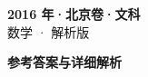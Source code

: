 \documentclass[zihao=-4, a4paper]{ctexart}
\begin{document}
\begin{center}
  {\Large\bfseries 2016 年·北京卷·文科}\\[4pt]
  {\large 数学 · 解析版}
\end{center}
\medskip
{}

\clearpage
{}
\begin{center}{\Large\bfseries 参考答案与详细解析}\end{center}
\medskip

\end{document}
